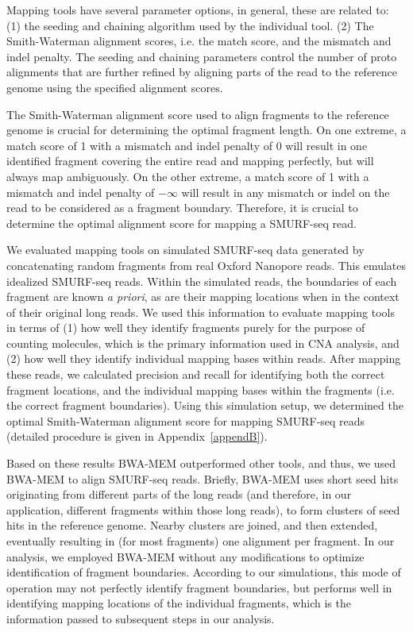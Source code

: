 Mapping tools have several parameter options, in general, these are
related to: (1) the seeding and chaining algorithm used by the
individual tool.  (2) The Smith-Waterman alignment scores, i.e. the
match score, and the mismatch and indel penalty. The seeding and
chaining parameters control the number of proto alignments that are
further refined by aligning parts of the read to the reference genome
using the specified alignment scores.

The Smith-Waterman alignment score used to align fragments to the
reference genome is crucial for determining the optimal fragment length.
On one extreme, a match score of 1 with a mismatch and indel penalty of
0 will result in one identified fragment covering the entire read and
mapping perfectly, but will always map ambiguously. On the other
extreme, a match score of 1 with a mismatch and indel penalty of
$-\infty$ will result in any mismatch or indel on the read to be
considered as a fragment boundary. Therefore, it is crucial to determine
the optimal alignment score for mapping a SMURF-seq read.

We evaluated mapping tools on simulated SMURF-seq data generated by
concatenating random fragments from real Oxford Nanopore reads. This
emulates idealized SMURF-seq reads. Within the simulated reads, the
boundaries of each fragment are known \textit{a priori}, as are their
mapping locations when in the context of their original long reads. We
used this information to evaluate mapping tools in terms of (1) how well
they identify fragments purely for the purpose of counting molecules,
which is the primary information used in CNA analysis, and (2) how well
they identify individual mapping bases within reads. After mapping these
reads, we calculated precision and recall for identifying both the
correct fragment locations, and the individual mapping bases within the
fragments (i.e. the correct fragment boundaries). Using this simulation
setup, we determined the optimal Smith-Waterman alignment score for
mapping SMURF-seq reads (detailed procedure is given in
Appendix~\ref{appendB}).

Based on these results BWA-MEM outperformed other tools, and thus, we
used BWA-MEM to align SMURF-seq reads.
%
Briefly, BWA-MEM uses short seed hits originating from different parts
of the long reads (and therefore, in our application, different
fragments within those long reads), to form clusters of seed hits in the
reference genome. Nearby clusters are joined, and then extended,
eventually resulting in (for most fragments) one alignment per fragment.
%
In our analysis, we employed BWA-MEM without any modifications to
optimize identification of fragment boundaries.  According to our
simulations, this mode of operation may not perfectly identify fragment
boundaries, but performs well in identifying mapping locations of the
individual fragments, which is the information passed to subsequent
steps in our analysis.


